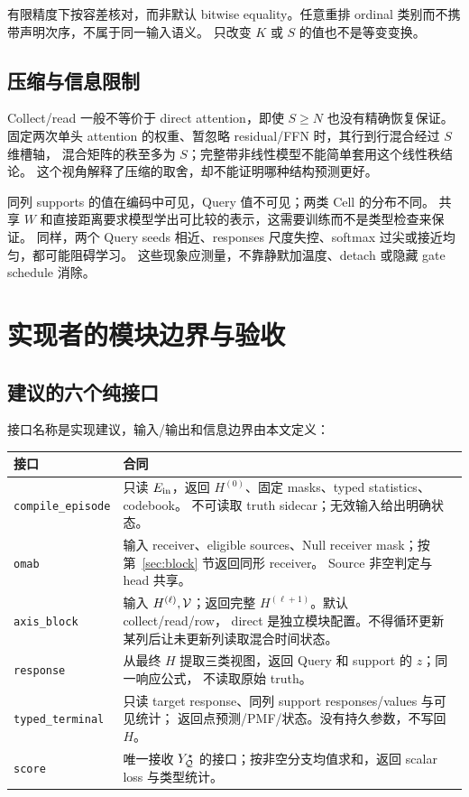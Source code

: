 \documentclass[11pt,UTF8,fontset=fandol]{ctexart}
\begin{document}
有限精度下按容差核对，而非默认 bitwise equality。任意重排 ordinal 类别而不携带声明次序，不属于同一输入语义。
只改变 $K$ 或 $S$ 的值也不是等变变换。

\subsection{压缩与信息限制}
Collect/read 一般不等价于 direct attention，即使 $S\ge N$ 也没有精确恢复保证。
固定两次单头 attention 的权重、暂忽略 residual/FFN 时，其行到行混合经过 $S$ 维槽轴，
混合矩阵的秩至多为 $S$；完整带非线性模型不能简单套用这个线性秩结论。
这个视角解释了压缩的取舍，却不能证明哪种结构预测更好。

同列 supports 的值在编码中可见，Query 值不可见；两类 Cell 的分布不同。
共享 $W$ 和直接距离要求模型学出可比较的表示，这需要训练而不是类型检查来保证。
同样，两个 Query seeds 相近、responses 尺度失控、softmax 过尖或接近均匀，都可能阻碍学习。
这些现象应测量，不靠静默加温度、detach 或隐藏 gate schedule 消除。

\section{实现者的模块边界与验收}
\label{sec:acceptance}

\subsection{建议的六个纯接口}
接口名称是实现建议，输入/输出和信息边界由本文定义：
\begin{longtable}{@{}p{37mm}p{113mm}@{}}\toprule
接口 & 合同 \\\midrule\endhead
\texttt{compile\_episode} & 只读 $E_{\rm in}$，返回 $H^{(0)}$、固定 masks、typed statistics、codebook。
不可读取 truth sidecar；无效输入给出明确状态。\\
\texttt{omab} & 输入 receiver、eligible sources、Null receiver mask；按第~\ref{sec:block} 节返回同形 receiver。
Source 非空判定与 head 共享。\\
\texttt{axis\_block} & 输入 $H^{(\ell)},\mathcal V$；返回完整 $H^{(\ell+1)}$。默认 collect/read/row，
direct 是独立模块配置。不得循环更新某列后让未更新列读取混合时间状态。\\
\texttt{response} & 从最终 $H$ 提取三类视图，返回 Query 和 support 的 $z$；同一响应公式，
不读取原始 truth。\\
\texttt{typed\_terminal} & 只读 target response、同列 support responses/values 与可见统计；
返回点预测/PMF/状态。没有持久参数，不写回 $H$。\\
\texttt{score} & 唯一接收 $Y^\star_\mathcal Q$ 的接口；按非空分支均值求和，返回 scalar loss 与类型统计。\\\bottomrule
\end{longtable}
\end{document}
